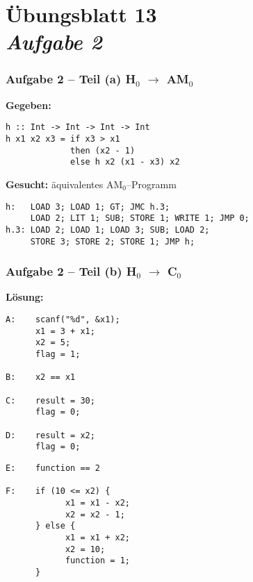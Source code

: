 \documentclass{beamer}
\begin{document}
\section{Übungsblatt 13 \\ \itshape Aufgabe 2}

\begin{frame}[t, fragile] \frametitle{Aufgabe 2 -- Teil (a) \hfill H${}_\text{0}$ $\to$ AM${}_\text{0}$}
	\textbf{Gegeben:}
	\begin{lstlisting}
h :: Int -> Int -> Int -> Int
h x1 x2 x3 = if x3 > x1
             then (x2 - 1)
             else h x2 (x1 - x3) x2
	\end{lstlisting}
	
	\textbf{Gesucht:} äquivalentes AM${}_\text{0}$--Programm
	\pause
	\begin{lstlisting}[style=am0]
h:   LOAD 3; LOAD 1; GT; JMC h.3;
     LOAD 2; LIT 1; SUB; STORE 1; WRITE 1; JMP 0;
h.3: LOAD 2; LOAD 1; LOAD 3; SUB; LOAD 2;
     STORE 3; STORE 2; STORE 1; JMP h;
	\end{lstlisting}
\end{frame}

\begin{frame}[fragile] \frametitle{Aufgabe 2 -- Teil (b) \hfill H${}_\text{0}$ $\to$ C${}_\text{0}$}
	\textbf{Lösung:}
	
	\begin{minipage}[t]{\dimexpr0.5\linewidth-\fboxrule-\fboxsep}
		\begin{lstlisting}[numbers=none]
A:    scanf("%d", &x1);
      x1 = 3 + x1;
      x2 = 5;
      flag = 1;
      
B:    x2 == x1

C:    result = 30;
      flag = 0;
      
D:    result = x2;
      flag = 0;
		\end{lstlisting}
	\end{minipage}
	\begin{minipage}[t]{\dimexpr0.5\linewidth-\fboxrule-\fboxsep}
		\begin{lstlisting}[numbers=none]
E:    function == 2

F:    if (10 <= x2) {
            x1 = x1 - x2;
            x2 = x2 - 1;
      } else {
            x1 = x1 + x2;
            x2 = 10;
            function = 1;
      }
		\end{lstlisting}
	\end{minipage}


\end{frame}
\end{document}
